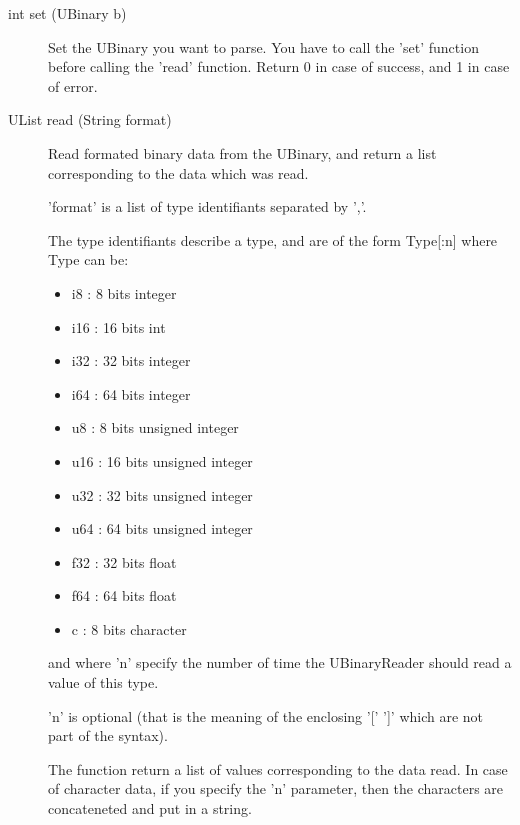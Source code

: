 \noindent
\begin{description}
\item[{int set (UBinary b)}]      Set the UBinary you want to parse. You have to call the 'set'
          function before calling the 'read' function.
          Return 0 in case of success, and 1 in case of error.

\item[{UList read (String format)}]       Read formated binary data from the UBinary, and return a list
  corresponding to the data which was read.


  'format' is a list of type identifiants separated by ','.


  The type identifiants describe a type, and are of the form Type[:n]
  where Type can be:
  \begin{itemize}

\item{}i8  : 8 bits integer

\item{}i16 : 16 bits int

\item{}i32 : 32 bits integer

\item{}i64 : 64 bits integer

\item{}u8  : 8 bits unsigned integer

\item{}u16 : 16 bits unsigned integer

\item{}u32 : 32 bits unsigned integer

\item{}u64 : 64 bits unsigned integer

\item{}f32 : 32 bits float

\item{}f64 : 64 bits float

\item{}c   : 8 bits character
\end{itemize}
and where 'n' specify the number of time the UBinaryReader should read
a value of this type.


'n' is optional (that is the meaning of the enclosing '[' ']' which
are not part of the syntax).


The function return a list of values corresponding to the data read.
In case of character data, if you specify the 'n' parameter, then the
characters are concateneted and put in a string.



\end{description}
